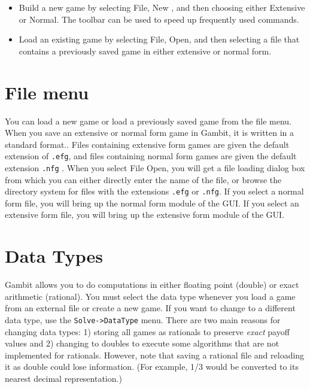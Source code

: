 \begin{itemize}
\item Build a new game by selecting File, New , and then choosing either 
Extensive or Normal.  The toolbar can be used to speed up frequently used
commands. 
\item  Load an existing game by selecting File, Open, and then selecting 
a file that contains a previously saved game in either extensive or normal form.
\end{itemize}


\section{File menu}
You can load a new game or load a previously saved game from the file 
menu.  When you save an extensive or normal form game in Gambit, it is 
written in a standard format..  Files containing extensive form games are
given the default extension of \verb+.efg+, and files containing normal
form games are given the default extension \verb+.nfg+ .  When you select
File Open, you will get a file loading dialog box from which you can
either directly enter the name of the file, or browse the directory system
for files with the extensions \verb+.efg+ or \verb+.nfg+.  If you select a
normal form file, you will bring up the normal form module of the GUI.  If
you select an extensive form file, you will bring up the extensive form
module of the GUI.

\section{Data Types}
Gambit allows you to do computations in either floating point (double) or
exact arithmetic (rational).  You must select the data type whenever you
load a game from an external file or create a new game.  If you want to
change to a different data type, use the {\tt Solve->DataType} menu.  There
are two main reasons for changing data types: 1) storing all games as
rationals to preserve {\em exact} payoff values and 2) changing to doubles
to execute some algorithms that are not implemented for rationals.
However, note that saving a rational file and
reloading it as double could lose information.  (For example, 1/3 would
be converted to its nearest decimal representation.)

